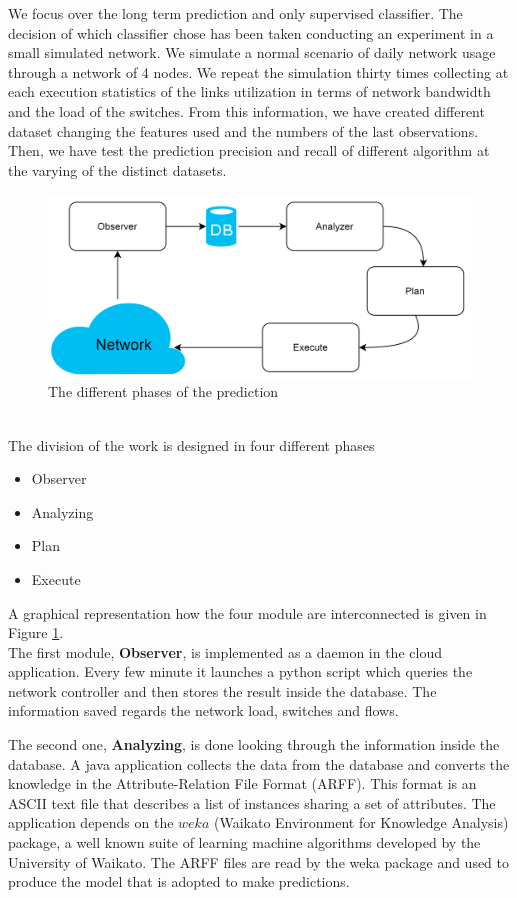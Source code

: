\documentclass[12pt]{article}
\begin{document}
We focus over the long term prediction and only supervised classifier.
The decision of which classifier chose has been taken conducting an experiment in a small simulated network. 
We simulate a normal scenario of daily network usage through a network of 4 nodes. 
We repeat the simulation thirty times collecting at each execution statistics of the links utilization in terms of network bandwidth and the load of the switches.
From this information, we have created different dataset changing the features used and the numbers of the last observations.
Then, we have test the prediction precision and recall of different algorithm at the varying of the distinct datasets. 
\begin{figure}[h!]
	\centering
	\includegraphics[width=1\textwidth]{img/predictionGraph.png}
	\caption[]
	{The different phases of the prediction}
	\label{fig:predictionConf}
\end{figure}\\
The division of the work is designed in four different phases
\begin{itemize}
	\item Observer
	\item Analyzing
	\item Plan
	\item Execute
\end{itemize}
A graphical representation how the four module are interconnected is given in Figure \ref{fig:predictionConf}.\\
The first module, \textbf{Observer}, is implemented as a daemon in the cloud application. 
Every few minute it launches a python script which queries the network controller and then stores the result inside the database.
The information saved regards the network load, switches and flows.


The second one, \textbf{Analyzing}, is done looking through the information inside the database. 
A java application collects the data from the database and converts the knowledge in the Attribute-Relation File Format (ARFF). 
This format is an ASCII text file that describes a list of instances sharing a set of attributes.
The application depends on the $weka$ (Waikato Environment for Knowledge Analysis) package, a well known suite of learning machine algorithms developed by the University of Waikato.
The ARFF files are read by the weka package and used to produce the model that is adopted to make predictions.
\end{document}
